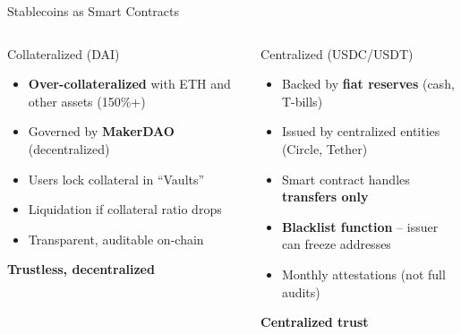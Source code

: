 \documentclass[8pt,aspectratio=169]{beamer}
\begin{document}
\begin{frame}{Stablecoins as Smart Contracts}
\begin{columns}[T]
\begin{block}{\textcolor{mlblue}{Collateralized (DAI)}}
\footnotesize
\begin{itemize}
  \item \textbf{Over-collateralized} with ETH and other assets (150\%+)
  \item Governed by \textbf{MakerDAO} (decentralized)
  \item Users lock collateral in ``Vaults''
  \item Liquidation if collateral ratio drops
  \item Transparent, auditable on-chain
\end{itemize}
\vspace{1mm}
\centering
\textcolor{mlblue}{\textbf{Trustless, decentralized}}
\end{block}

\begin{block}{\textcolor{mlorange}{Centralized (USDC/USDT)}}
\footnotesize
\begin{itemize}
  \item Backed by \textbf{fiat reserves} (cash, T-bills)
  \item Issued by centralized entities (Circle, Tether)
  \item Smart contract handles \textbf{transfers only}
  \item \textbf{Blacklist function} -- issuer can freeze addresses
  \item Monthly attestations (not full audits)
\end{itemize}
\vspace{1mm}
\centering
\textcolor{mlorange}{\textbf{Centralized trust}}
\end{block}


\end{columns}
\end{frame}
\end{document}
